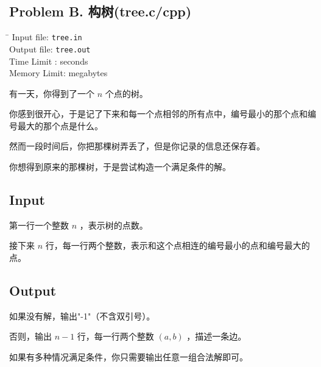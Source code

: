 \documentclass[11pt,a4paper]{article}
\begin{document}
\begin{spacing}{1.25}
	\newpage

	\section{Problem B. 构树(tree.c/cpp)} 
		\begin{tabbing}
			\hspace{4cm} \= \kill
			\indent  Input file: \> \texttt{tree.in} \\
			\indent  Output file: \> \texttt{tree.out} \\
			\indent  Time Limit :  seconds \\
			\indent  Memory Limit:  megabytes 
		\end{tabbing}\par
		有一天，你得到了一个 $n$ 个点的树。

		你感到很开心，于是记了下来和每一个点相邻的所有点中，编号最小的那个点和编号最大的那个点是什么。

		然而一段时间后，你把那棵树弄丢了，但是你记录的信息还保存着。

		你想得到原来的那棵树，于是尝试构造一个满足条件的解。

		\subsection{Input}

		第一行一个整数 $n$ ，表示树的点数。

		接下来 $n$ 行，每一行两个整数，表示和这个点相连的编号最小的点和编号最大的点。

		\subsection{Output}
		
		如果没有解，输出"-1"（不含双引号）。

		否则，输出 $n-1$ 行，每一行两个整数 $(a,b)$ ，描述一条边。

		如果有多种情况满足条件，你只需要输出任意一组合法解即可。


\end{spacing}
\end{document}
